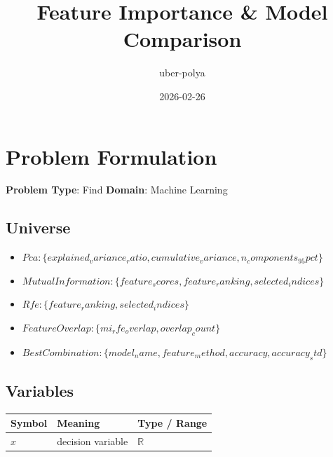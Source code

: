 \documentclass[11pt, a4paper]{article}
\title{Feature Importance \& Model Comparison}
\author{uber-polya}
\date{2026-02-26}
\begin{document}
\maketitle
\tableofcontents
\newpage

\section{Problem Formulation}

\begin{polyamodel}

\textbf{Problem Type}: Find \hfill
\textbf{Domain}: Machine Learning


\end{polyamodel}

\subsection{Universe}

\begin{itemize}
  \item $Pca: \{explained_variance_ratio, cumulative_variance, n_components_95pct\}$
  \item $Mutual Information: \{feature_scores, feature_ranking, selected_indices\}$
  \item $Rfe: \{feature_ranking, selected_indices\}$
  \item $Feature Overlap: \{mi_rfe_overlap, overlap_count\}$
  \item $Best Combination: \{model_name, feature_method, accuracy, accuracy_std\}$
\end{itemize}

\subsection{Variables}

\begin{longtable}{lll}
\toprule
\textbf{Symbol} & \textbf{Meaning} & \textbf{Type / Range} \\
\midrule
\endhead
$x$ & decision variable & $\mathbb{{R}}$ \\
\bottomrule
\end{longtable}

\end{document}
